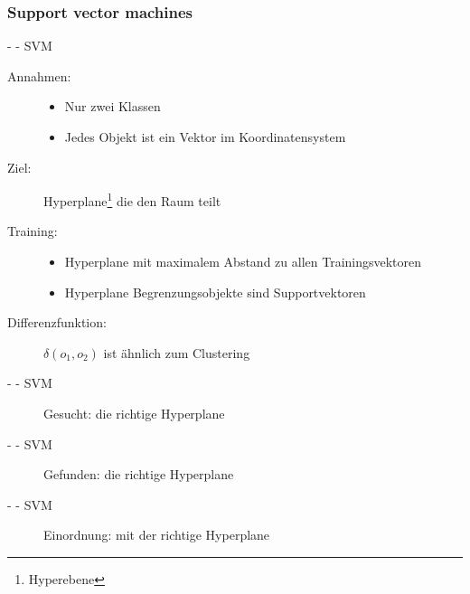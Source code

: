\documentclass[fleqn,11pt,aspectratio=43]{beamer}
\begin{document}
\subsubsection{Support vector machines~}\label{svm}

\begin{frame}{\insertsectionhead - \insertsubsectionhead - SVM \cite{dwh}}
\begin{description}
\item[Annahmen:]
\begin{itemize}
\item Nur zwei Klassen
\item Jedes Objekt ist ein Vektor im Koordinatensystem
\end{itemize}
\item[Ziel:]  Hyperplane\footnote{Hyperebene} die den Raum teilt 
\item[Training:]
\begin{itemize}
\item Hyperplane mit maximalem Abstand zu allen Trainingsvektoren
\item Hyperplane Begrenzungsobjekte sind Supportvektoren
\end{itemize} 
\item[Differenzfunktion:] $\delta(o_1, o_2)$ ist ähnlich zum Clustering
\end{description}
\end{frame}

\begin{frame}{\insertsectionhead - \insertsubsectionhead - SVM}
\begin{figure}
\scalebox{.8}{}
\caption{Gesucht: die richtige Hyperplane}
\end{figure}
\end{frame}

\begin{frame}{\insertsectionhead - \insertsubsectionhead - SVM}
\begin{figure}
\scalebox{.8}{}
\caption{Gefunden: die richtige Hyperplane}
\end{figure}
\end{frame}

\begin{frame}{\insertsectionhead - \insertsubsectionhead - SVM}
\begin{figure}
\scalebox{.8}{}
\caption{Einordnung: mit der richtige Hyperplane}
\end{figure}
\end{frame}
\end{document}
